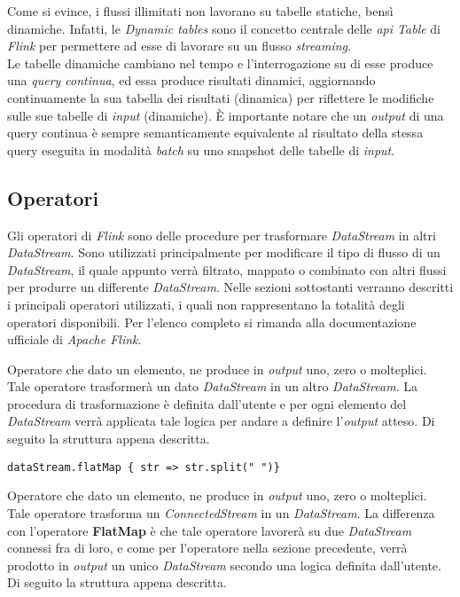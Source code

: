 Come si evince, i flussi illimitati non lavorano su tabelle statiche, bensì dinamiche. Infatti, le \textit{Dynamic tables} sono il concetto centrale delle \textit{\gls{api} Table} di \textit{Flink} per permettere ad esse di lavorare su un flusso \textit{streaming}.\\
Le tabelle dinamiche cambiano nel tempo e l'interrogazione su di esse produce una \textit{\gls{query} continua}, ed essa produce risultati dinamici, aggiornando continuamente la sua tabella dei risultati (dinamica) per riflettere le modifiche sulle sue tabelle di \textit{input} (dinamiche). È importante notare che un \textit{output} di una \gls{query} continua è sempre semanticamente equivalente al risultato della stessa \gls{query} eseguita in modalità \textit{batch} su uno \gls{snapshot} delle tabelle di \textit{input}.



\subsection{Operatori}\label{sec:operatori}
Gli operatori di \textit{Flink} sono delle procedure per trasformare \textit{DataStream} in altri \textit{DataStream}. Sono utilizzati principalmente per modificare il tipo di flusso di un \textit{DataStream}, il quale appunto verrà filtrato, mappato o combinato con altri flussi per produrre un differente \textit{DataStream}. Nelle sezioni sottostanti verranno descritti i principali operatori utilizzati, i quali non rappresentano la totalità degli operatori disponibili. Per l'elenco completo si rimanda alla documentazione ufficiale di \textit{Apache Flink}.

Operatore che dato un elemento, ne produce in \textit{output} uno, zero o molteplici. Tale operatore trasformerà un dato \textit{DataStream} in un altro \textit{DataStream}. La procedura di trasformazione è definita dall'utente e per ogni elemento del \textit{DataStream} verrà applicata tale logica per andare a definire l'\textit{output} atteso. Di seguito la struttura appena descritta.

\begin{verbatim}
dataStream.flatMap { str => str.split(" ")}
\end{verbatim}
	
	
Operatore che dato un elemento, ne produce in \textit{output} uno, zero o molteplici. Tale operatore trasforma un \textit{ConnectedStream} in un \textit{DataStream}. La differenza con l'operatore \textbf{FlatMap} è che tale operatore lavorerà su due \textit{DataStream} connessi fra di loro, e come per l'operatore nella sezione precedente, verrà prodotto in \textit{output} un unico \textit{DataStream} secondo una logica definita dall'utente. Di seguito la struttura appena descritta.


